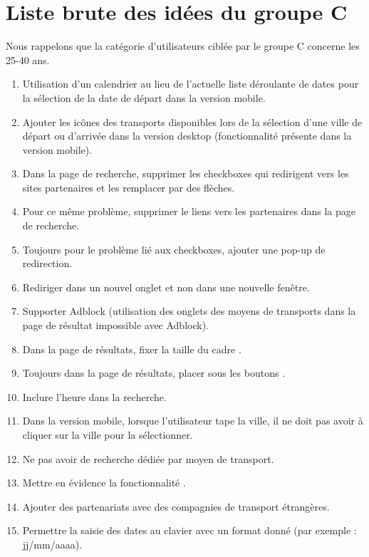 \section{Liste brute des id\'{e}es du groupe C}

Nous rappelons que la cat\'{e}gorie d'utilisateurs cibl\'{e}e par le groupe C concerne les 25-40 ans.



\begin{enumerate}
\item Utilisation d'un calendrier au lieu de l'actuelle liste d\'{e}roulante de dates pour la s\'{e}lection de la date de d\'{e}part dans la version mobile.
\item Ajouter les ic\^{o}nes des transports disponibles lors de la s\'{e}lection d'une ville de d\'{e}part ou d'arriv\'{e}e dans la version desktop (fonctionnalit\'{e} pr\'{e}sente dans la version mobile).
\item Dans la page de recherche, supprimer les checkboxes qui redirigent vers les sites partenaires et les remplacer par des fl\`{e}ches.
\item Pour ce m\^{e}me probl\`{e}me, supprimer le liens vers les partenaires dans la page de recherche.
\item Toujours pour le probl\`{e}me li\'{e} aux checkboxes, ajouter une pop-up de redirection.
\item Rediriger dans un nouvel onglet et non dans une nouvelle fen\^{e}tre.
\item Supporter Adblock (utilisation des onglets des moyens de transports dans la page de r\'{e}sultat impossible avec Adblock).
\item Dans la page de r\'{e}sultats, fixer la taille du cadre .
\item Toujours dans la page de r\'{e}sultats, placer  sous les boutons .
\item Inclure l'heure dans la recherche.
\item Dans la version mobile, lorsque l'utilisateur tape la ville, il ne doit pas avoir \`{a} cliquer sur la ville pour la s\'{e}lectionner.
\item Ne pas avoir de recherche d\'{e}di\'{e}e par moyen de transport.
\item Mettre en \'{e}vidence la fonctionnalit\'{e} .
\item Ajouter des partenariats avec des compagnies de transport \'{e}trang\`{e}res.
\item Permettre la saisie des dates au clavier avec un format donn\'{e} (par exemple : jj/mm/aaaa).

\end{enumerate}
